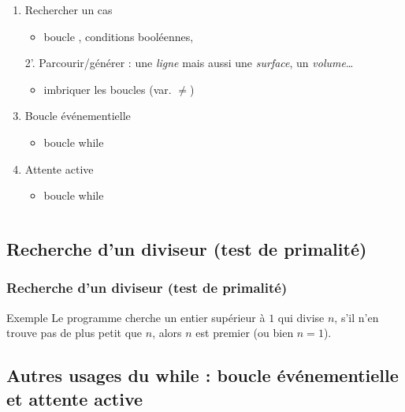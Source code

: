 \documentclass[xcolor=pdftex,svgnames,table]{beamer}
\begin{document}
\begin{frame}
\begin{columns}
\begin{column}[t]{0.59\linewidth}
\begin{enumerate}
\setcounter{enumi}{\value{savedenumi}}
    \item Rechercher un cas\pause
      \begin{itemize}
        \item boucle \alert{}, conditions booléennes, 
      \end{itemize}\pause
    \item[2'.] Parcourir/générer : une \emph{ligne} mais aussi une \emph{surface}, un \emph{volume}\dots\pause
      \begin{itemize}
        \item imbriquer les boucles (var. $\neq$)
      \end{itemize}\pause
    \item Boucle événementielle
  \begin{itemize}
\item boucle \alert{while}
  \end{itemize}\pause
    \item Attente active 
  \begin{itemize}
\item boucle \alert{while}
  \end{itemize}
\end{enumerate}
\end{column}
\end{columns}
\end{frame}


\subsection{Recherche d'un diviseur (test de primalité)}

\begin{frame}[fragile]
\frametitle{Recherche d'un diviseur (test de primalité)}

\begin{block}{Exemple}
  Le programme cherche un entier supérieur à $1$ qui divise $n$, s'il n'en trouve pas
 de plus petit que $n$, alors $n$ est premier (ou bien $n = 1$).\nowrite
\end{block}

\end{frame}


\subsection{Autres usages du while : boucle événementielle et attente active}
\end{document}
